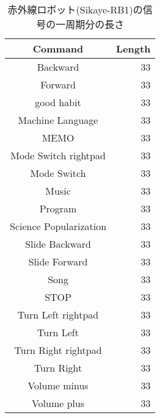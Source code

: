 \begin{table}[htbp] \begin{center}
    \caption{赤外線ロボット(Sikaye-RB1)の信号の一周期分の長さ}
    \label{ir_robot_signal_ideal}
    \begin{tabular}{cr}
\hline
Command & Length \\
\hline
Backward & 33 \\
Forward & 33 \\
good habit & 33 \\
Machine Language & 33 \\
MEMO & 33 \\
Mode Switch rightpad & 33 \\
Mode Switch & 33 \\
Music & 33 \\
Program & 33 \\
Science Popularization & 33 \\
Slide Backward & 33 \\
Slide Forward & 33 \\
Song & 33 \\
STOP & 33 \\
Turn Left rightpad & 33 \\
Turn Left & 33 \\
Turn Right rightpad & 33 \\
Turn Right & 33 \\
Volume minus & 33 \\
Volume plus & 33 \\
\hline
    \end{tabular}
\end{center} \end{table}

